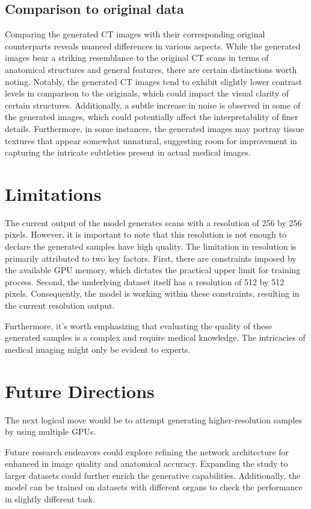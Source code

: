 \documentclass[11pt,a4paper]{report}
\begin{document}
\subsection{Comparison to original data}
Comparing the generated CT images with their corresponding original counterparts reveals nuanced differences in various aspects. While the generated images bear a striking resemblance to the original CT scans in terms of anatomical structures and general features, there are certain distinctions worth noting. Notably, the generated CT images tend to exhibit slightly lower contrast levels in comparison to the originals, which could impact the visual clarity of certain structures. Additionally, a subtle increase in noise is observed in some of the generated images, which could potentially affect the interpretability of finer details. Furthermore, in some instances, the generated images may portray tissue textures that appear somewhat unnatural, suggesting room for improvement in capturing the intricate subtleties present in actual medical images.


\section{Limitations}

The current output of the model generates scans with a resolution of 256 by 256 pixels. However, it is important to note that this resolution is not enough to declare the generated samples have high quality. The limitation in resolution is primarily attributed to two key factors. First, there are constraints imposed by the available GPU memory, which dictates the practical upper limit for training process. Second, the underlying dataset itself has a resolution of 512 by 512 pixels. Consequently, the model is working within these constraints, resulting in the current resolution output.

Furthermore, it's worth emphasizing that evaluating the quality of these generated samples is a complex and require medical knowledge. The intricacies of medical imaging might only be evident to experts.
\section{Future Directions}
The next logical move would be to attempt generating higher-resolution samples by using multiple GPUs.

Future research endeavors could explore refining the network architecture for enhanced in image quality and anatomical accuracy. Expanding the study to larger datasets could further enrich the generative capabilities. Additionally, the model can be trained on datasets with different organs to check the performance in slightly different task.
\end{document}
